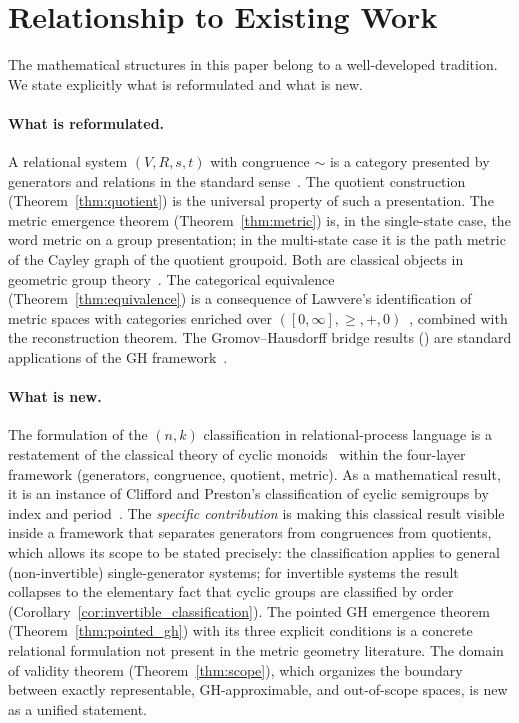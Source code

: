 \documentclass{article}
\theoremstyle{definition}
\theoremstyle{remark}
\begin{document}
\section{Relationship to Existing Work}
\label{sec:related}

The mathematical structures in this paper belong to a well-developed
tradition. We state explicitly what is reformulated and what is new.

\paragraph{What is reformulated.}
A relational system $(V, R, s, t)$ with congruence $\sim$ is a
category presented by generators and relations in the standard
sense~\cite{maclane, awodey}. The quotient construction
(Theorem~\ref{thm:quotient}) is the universal property of such a
presentation. The metric emergence theorem
(Theorem~\ref{thm:metric}) is, in the single-state case, the word
metric on a group presentation; in the multi-state case it is the
path metric of the Cayley graph of the quotient groupoid. Both
are classical objects in geometric group theory~\cite{graphgeom}.
The categorical equivalence (Theorem~\ref{thm:equivalence}) is a
consequence of Lawvere's identification of metric spaces with
categories enriched over $([0,\infty], \geq, +, 0)$~\cite{lawvere},
combined with the reconstruction theorem. The Gromov--Hausdorff
bridge results () are standard applications
of the GH framework~\cite{buragoetal}.

\paragraph{What is new.}
The formulation of the $(n,k)$ classification in
relational-process language is a restatement of the classical
theory of cyclic monoids~\cite{cliffordpreston} within the
four-layer framework (generators, congruence, quotient, metric).
As a mathematical result, it is an instance of Clifford and
Preston's classification of cyclic semigroups by index and
period~\cite{cliffordpreston}. The \emph{specific contribution}
is making this classical result visible inside a framework that
separates generators from congruences from quotients, which
allows its scope to be stated precisely: the classification
applies to general (non-invertible) single-generator systems;
for invertible systems the result collapses to the elementary
fact that cyclic groups are classified by order
(Corollary~\ref{cor:invertible_classification}). The pointed GH
emergence theorem (Theorem~\ref{thm:pointed_gh}) with its three
explicit conditions is a concrete relational formulation not
present in the metric geometry literature. The domain of
validity theorem (Theorem~\ref{thm:scope}), which organizes the
boundary between exactly representable, GH-approximable, and
out-of-scope spaces, is new as a unified statement.
\end{document}
